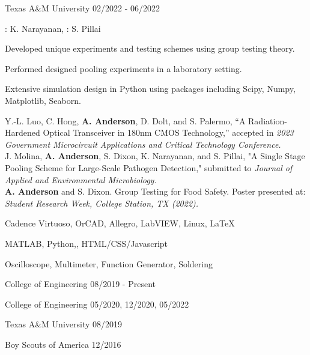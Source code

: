 \documentclass[11pt]{article}
\begin{document}
\begin{description}
\squish
{}
            {Texas A\&M University}
            {02/2022 - 06/2022}

\underline{}: K. Narayanan, \underline{}: S. Pillai

\textbullet \space Developed unique experiments and testing schemes using group testing theory.

\textbullet \space Performed designed pooling experiments in a laboratory setting.

\textbullet \space Extensive simulation design in Python using packages including Scipy, Numpy, Matplotlib, Seaborn.

\end{description}


Y.-L. Luo, C. Hong, \textbf{A. Anderson}, D. Dolt, and S. Palermo, “A Radiation-Hardened Optical Transceiver in 180nm CMOS Technology,” accepted in \textit{2023 Government Microcircuit Applications and Critical Technology Conference.} \\

J. Molina, \textbf{A. Anderson}, S. Dixon, K. Narayanan, and S. Pillai, "A Single Stage Pooling Scheme for Large-Scale Pathogen Detection," submitted to \textit{Journal of Applied and Environmental Microbiology.} \\

\textbf{A. Anderson} and S. Dixon. Group Testing for Food Safety. Poster presented at: \textit{Student Research Week, College Station, TX (2022).}
\\


      {Cadence Virtuoso, OrCAD, Allegro, LabVIEW, Linux, \LaTeX}

      {MATLAB, Python,\CPP, HTML/CSS/Javascript}

      {Oscilloscope, Multimeter, Function Generator, Soldering}


\bigskip




\begin{description}
\squish
{}
           {College of Engineering}
           {08/2019 - Present}

           {College of Engineering}
           {05/2020, 12/2020, 05/2022}

           {Texas A\&M University}
           {08/2019}

           {Boy Scouts of America}
           {12/2016}

\end{description}
\end{document}
